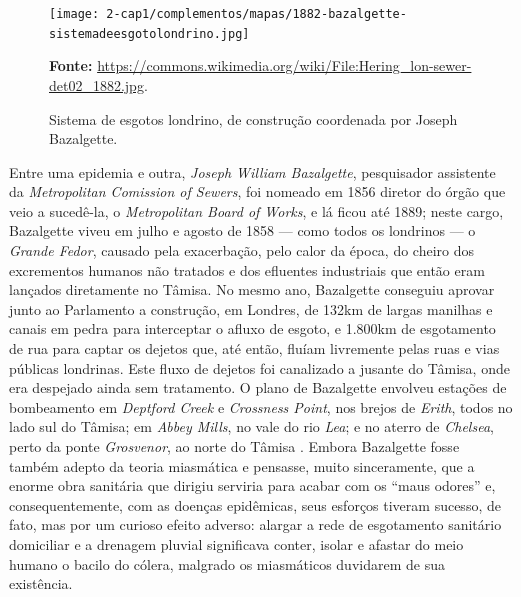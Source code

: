 \begin{figure}
\centering
\caption{Sistema de esgotos londrino, de construção coordenada por Joseph Bazalgette.}
\texttt{[image: 2-cap1/complementos/mapas/1882-bazalgette-sistemadeesgotolondrino.jpg]}{\par \footnotesize \textbf{Fonte:} \url{https://commons.wikimedia.org/wiki/File:Hering_lon-sewer-det02_1882.jpg}. \par}
\label{fig:esgotoslondres1882} 
\end{figure}

Entre uma epidemia e outra, \textit{Joseph William Bazalgette}, pesquisador assistente da \textit{Metropolitan Comission of Sewers}, foi nomeado em 1856 diretor do órgão que veio a sucedê-la, o \textit{Metropolitan Board of Works}, e lá ficou até 1889; neste cargo, Bazalgette viveu em julho e agosto de 1858 --- como todos os londrinos --- o \textit{Grande Fedor}, causado pela exacerbação, pelo calor da época, do cheiro dos excrementos humanos não tratados e dos efluentes industriais que então eram lançados diretamente no Tâmisa. No mesmo ano, Bazalgette conseguiu aprovar junto ao Parlamento a construção, em Londres, de 132km de largas manilhas e canais em pedra para interceptar o afluxo de esgoto, e 1.800km de esgotamento de rua para captar os dejetos que, até então, fluíam livremente pelas ruas e vias públicas londrinas. Este fluxo de dejetos foi canalizado a jusante do Tâmisa, onde era despejado ainda sem tratamento. O plano de Bazalgette envolveu estações de bombeamento em \textit{Deptford Creek} e \textit{Crossness Point}, nos brejos de \textit{Erith}, todos no lado sul do Tâmisa; em \textit{Abbey Mills}, no vale do rio \textit{Lea}; e no aterro de \textit{Chelsea}, perto da ponte \textit{Grosvenor}, ao norte do Tâmisa \cite{bazalgette_london_1865, bazalgette_metropolitan_1865}. Embora Bazalgette fosse também adepto da teoria miasmática e pensasse, muito sinceramente, que a enorme obra sanitária que dirigiu serviria para acabar com os ``maus odores'' e, consequentemente, com as doenças epidêmicas, seus esforços tiveram sucesso, de fato, mas por um curioso efeito adverso: alargar a rede de esgotamento sanitário domiciliar e a drenagem pluvial significava conter, isolar e afastar do meio humano o bacilo do cólera, malgrado os miasmáticos duvidarem de sua existência.


